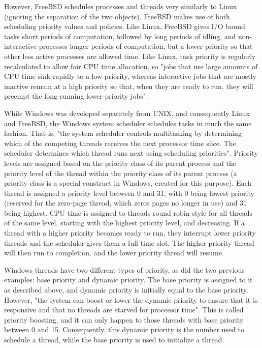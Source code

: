 \documentclass[10pt,draftclsnofoot,onecolumn]{IEEEtran}
\begin{document}
    However, FreeBSD schedules processes and threads very similarly to Linux (ignoring the separation of the two objects). FreeBSD makes use of both scheduling priority values and policies. Like Linux, FreeBSD gives I/O bound tasks short periods of computation, followed by long periods of idling, and non-interactive processes longer periods of computation, but a lower priority so that other less active processes are allowed time. Like Linux, task priority is regularly recalculated to allow fair CPU time allocation, so "jobs that use large amounts of CPU time sink rapidly to a low priority, whereas interactive jobs that are mostly inactive remain at a high priority so that, when they are ready to run, they will preempt the long-running lower-priority jobs" \cite{mckusick_neville-neil_watson_mckusick_2015}.\par
    While Windows was developed separately from UNIX, and consequently Linux and FreeBSD, the Windows system scheduler schedules tasks in much the same fashion. That is, "the system scheduler controls multitasking by determining which of the competing threads receives the next processor time slice. The scheduler determines which thread runs next using scheduling priorities"\cite{Scheduling}. Priority levels are assigned based on the priority class of its parent process and the priority level of the thread within the priority class of its parent process (a priority class is a special construct in Windows, created for this purpose). Each thread is assigned a priority level between 0 and 31, with 0 being lowest priority (reserved for the zero-page thread, which zeros pages no longer in use) and 31 being highest. CPU time is assigned to threads round robin style for all threads of the same level, starting with the highest priority level, and decreasing. If a thread with a higher priority becomes ready to run, they interrupt lower priority threads and the scheduler gives them a full time slot. The higher priority thread will then run to completion, and the lower priority thread will resume.\par
    Windows threads have two different types of priority, as did the two previous examples: base priority and dynamic priority. The base priority is assigned to it as described above, and dynamic priority is initially equal to the base priority. However, "the system can boost or lower the dynamic priority to ensure that it is responsive and that no threads are starved for processor time"\cite{Scheduling}. This is called priority boosting, and it can only happen to those threads with base priority between 0 and 15. Consequently, this dynamic priority is the number used to schedule a thread, while the base priority is used to initialize a thread.\par
\end{document}
